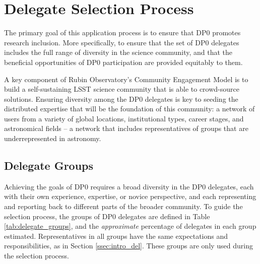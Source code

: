 \documentclass[DM,lsstdraft,authoryear,toc]{lsstdoc}
\begin{document}
\section{Delegate Selection Process}\label{sec:sel}

The primary goal of this application process is to ensure that DP0 promotes research inclusion.
More specifically, to ensure that the set of DP0 delegates includes the full range of diversity in the science community, and that the beneficial opportunities of DP0 participation are provided equitably to them.

A key component of Rubin Observatory's Community Engagement Model  is to build a self-sustaining LSST science community that is able to crowd-source solutions. 
Ensuring diversity among the DP0 delegates is key to seeding the distributed expertise that will be the foundation of this community: a network of users from a variety of global locations, institutional types, career stages, and astronomical fields -- a network that includes representatives of groups that are underrepresented in astronomy.


\subsection{Delegate Groups}\label{ssec:sel_grps}

Achieving the goals of DP0 requires a broad diversity in the DP0 delegates, each with their own experience, expertise, or novice perspective, and each representing and reporting back to different parts of the broader community.
To guide the selection process, the groups of DP0 delegates are defined in Table \ref{tab:delegate_groups}, and the \emph{approximate} percentage of delegates in each group estimated.
Representatives in all groups have the same expectations and responsibilities, as in Section \ref{ssec:intro_del}.
These groups are only used during the selection process.
\end{document}
